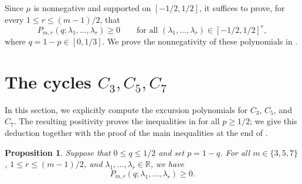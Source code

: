 \documentclass[11pt]{article}
\newtheorem{proposition}[theorem]{Proposition}
\theoremstyle{remark}
\numberwithin{equation}{section}
\newcommand{\R}{\mathbb R}
\begin{document}
Since $\mu$ is nonnegative and supported on $[-1/2,1/2]$, it suffices to
prove, for every $1\le r\le(m-1)/2$, that
\[
  P_{m,r}(q;\lambda_1,\ldots,\lambda_r)\ge0
  \qquad\text{for all }(\lambda_1,\ldots,\lambda_r)\in[-1/2,1/2]^r,
\]
where $q=1-p\in[0,1/3]$.
We prove the nonnegativity of these polynomials in .

\section{The cycles \texorpdfstring{$C_3,C_5,C_7$}{C3, C5, C7}}
\label{sec:short-cycles}

In this section, we explicitly compute the excursion polynomials for $C_3$, $C_5$, and $C_7$.
The resulting positivity proves the inequalities in  for all $p\ge1/2$; we give this deduction together with the proof of the main inequalities at the end of .

\begin{proposition}\label{prop:short-cycles}
  Suppose that $0\le q\le1/2$ and set $p=1-q$. For all $m\in\{3,5,7\}$,
  $1\le r\le(m-1)/2$, and $\lambda_1,\ldots,\lambda_r\in\R$, we have
  \[
    P_{m,r}(q;\lambda_1,\ldots,\lambda_r)\ge0.
  \]
\end{proposition}
\end{document}
